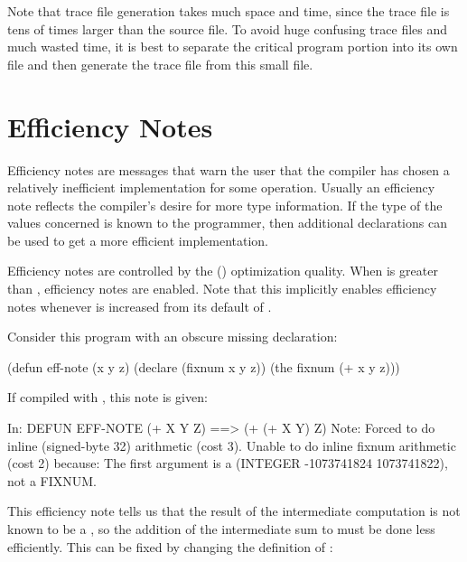 Note that trace file generation takes much space and time, since the trace file
is tens of times larger than the source file.  To avoid huge confusing trace
files and much wasted time, it is best to separate the critical program portion
into its own file and then generate the trace file from this small file.


\section{Efficiency Notes}
\label{efficiency-notes}

Efficiency notes are messages that warn the user that the compiler has
chosen a relatively inefficient implementation for some operation.
Usually an efficiency note reflects the compiler's desire for more
type information.  If the type of the values concerned is known to the
programmer, then additional declarations can be used to get a more
efficient implementation.

Efficiency notes are controlled by the
 ()
optimization quality. When  is greater than
, efficiency notes are enabled.
Note that this implicitly enables efficiency notes whenever
 is increased from its default of .

Consider this program with an obscure missing declaration:

\begin{lisp}
(defun eff-note (x y z)
  (declare (fixnum x y z))
  (the fixnum (+ x y z)))
\end{lisp}

If compiled with , this note is given:

\begin{example}
In: DEFUN EFF-NOTE
  (+ X Y Z)
==>
  (+ (+ X Y) Z)
Note: Forced to do inline (signed-byte 32) arithmetic (cost 3).
      Unable to do inline fixnum arithmetic (cost 2) because:
      The first argument is a (INTEGER -1073741824 1073741822),
      not a FIXNUM.
\end{example}

This efficiency note tells us that the result of the intermediate
computation  is not known to be a , so
the addition of the intermediate sum to  must be done less
efficiently.  This can be fixed by changing the definition of
:

